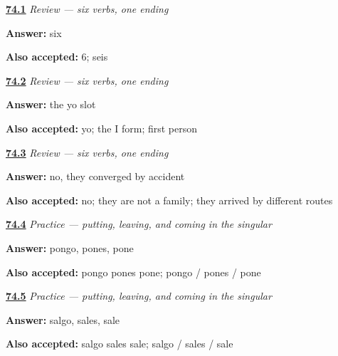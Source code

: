 \noindent\begin{minipage}[t]{\linewidth}
\raggedright
\hyperlink{review-ES-C13-repaso-yo-go-count}{\textbf{74.1}} \emph{Review — six verbs, one ending}\par
\small \textbf{Answer:} six\par
\footnotesize \textbf{Also accepted:} 6; seis
\end{minipage}\par\medskip

\noindent\begin{minipage}[t]{\linewidth}
\raggedright
\hyperlink{review-ES-C13-repaso-yo-go-slot}{\textbf{74.2}} \emph{Review — six verbs, one ending}\par
\small \textbf{Answer:} the yo slot\par
\footnotesize \textbf{Also accepted:} yo; the I form; first person
\end{minipage}\par\medskip

\noindent\begin{minipage}[t]{\linewidth}
\raggedright
\hyperlink{review-ES-C13-repaso-yo-go-why}{\textbf{74.3}} \emph{Review — six verbs, one ending}\par
\small \textbf{Answer:} no, they converged by accident\par
\footnotesize \textbf{Also accepted:} no; they are not a family; they arrived by different routes
\end{minipage}\par\medskip

\noindent\begin{minipage}[t]{\linewidth}
\raggedright
\hyperlink{review-ES-C13-practice-poner-forms}{\textbf{74.4}} \emph{Practice — putting, leaving, and coming in the singular}\par
\small \textbf{Answer:} pongo, pones, pone\par
\footnotesize \textbf{Also accepted:} pongo pones pone; pongo / pones / pone
\end{minipage}\par\medskip

\noindent\begin{minipage}[t]{\linewidth}
\raggedright
\hyperlink{review-ES-C13-practice-salir-forms}{\textbf{74.5}} \emph{Practice — putting, leaving, and coming in the singular}\par
\small \textbf{Answer:} salgo, sales, sale\par
\footnotesize \textbf{Also accepted:} salgo sales sale; salgo / sales / sale
\end{minipage}\par\medskip

